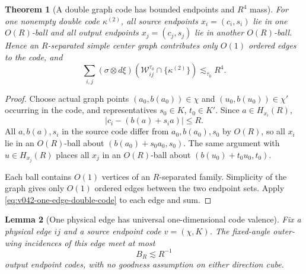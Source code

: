 \documentclass[10pt]{article}
\newtheorem{theorem}{Theorem}[section]
\newtheorem{lemma}[theorem]{Lemma}
\begin{document}
\begin{theorem}[A double graph code has bounded endpoints and \(R^4\) mass]
\label{thm:v042-double-code-capacity}
For one nonempty double code \(\kappa^{(2)}\), all source endpoints \(x_i=(c_i,s_i)\) lie in one
\(O(R)\)-ball and all output endpoints \(x_j=(c_j,s_j)\) lie in another \(O(R)\)-ball.  Hence an
\(R\)-separated simple center graph contributes only \(O(1)\) ordered edges to the code, and
\begin{equation}
\label{eq:v042-double-code-capacity}
\boxed{
\sum_{i,j}
(\sigma\otimes d\xi)
\left(
\mathcal W_{ij}^{\tau_0}
\cap
\{\kappa^{(2)}\}
\right)
\lesssim_{\tau_0}
R^4.
}
\end{equation}
\end{theorem}

\begin{proof}
Choose actual graph points
\((a_0,b(a_0))\in\chi\) and
\((u_0,b(u_0))\in\chi'\) occurring in the code, and representatives
\(s_0\in K\), \(t_0\in K'\).  Since \(a\in H_{x_i}(R)\),
\[
|c_i-(b(a)+s_i a)|
\le
R.
\]
All \(a,b(a),s_i\) in the source code differ from \(a_0,b(a_0),s_0\) by \(O(R)\), so all
\(x_i\) lie in an \(O(R)\)-ball about
\((b(a_0)+s_0a_0,s_0)\).  The same argument with \(u\in H_{x_j}(R)\) places all \(x_j\) in an
\(O(R)\)-ball about
\((b(u_0)+t_0u_0,t_0)\).

Each ball contains \(O(1)\) vertices of an \(R\)-separated family.  Simplicity of the graph gives
only \(O(1)\) ordered edges between the two endpoint sets.  Apply
\eqref{eq:v042-one-edge-double-code} to each edge and sum.
\end{proof}

\begin{lemma}[One physical edge has universal one-dimensional code valence]
\label{lem:v043-one-edge-code-valence}
Fix a physical edge \(ij\) and a source endpoint code \(v=(\chi,K)\).  The fixed-angle
outer-wing incidences of this edge meet at most
\begin{equation}
\label{eq:v043-one-edge-code-valence}
\boxed{
B_R
\lesssim
R^{-1}
}
\end{equation}
output endpoint codes, with no goodness assumption on either direction cube.
\end{lemma}
\end{document}
